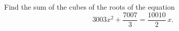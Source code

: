 Find the sum of the cubes of the roots of the equation
\[3003x^2+\dfrac{7007}{3}=\dfrac{10010}{2}\,x .\]
